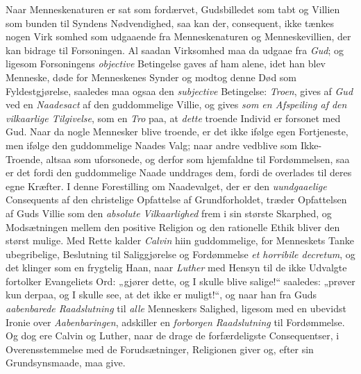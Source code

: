 Naar Menneskenaturen er sat som fordærvet, Gudsbilledet som tabt og Villien som
bunden til Syndens Nødvendighed, saa kan der, consequent, ikke tænkes nogen
Virk\-%
somhed som udgaaende fra Menneskenaturen og Menneskevillien, der kan bidrage til
Forsoningen. Al saadan Virksomhed maa da udgaae fra \emph{Gud}; og ligesom
Forsoningens \emph{objective} Betingelse gaves af ham alene, idet han blev
Menneske, døde for Menneskenes Synder og modtog denne Død som Fyldestgjørelse,
saaledes maa ogsaa den \emph{subjective} Betingelse: \emph{Troen}, gives af
\emph{Gud} ved en \emph{Naadesact} af den guddommelige Villie, og gives
\emph{som en Afspeiling af den vilkaarlige Tilgivelse}, som en \emph{Tro} paa,
at \emph{dette} troende Individ er forsonet med Gud. Naar da nogle Mennesker
blive troende, er det ikke ifølge egen Fortjeneste, men ifølge den guddommelige
Naades Valg; naar andre vedblive som Ikke-Troende, altsaa som uforsonede, og
derfor som hjemfaldne til Fordømmelsen, saa er det fordi den guddommelige Naade
unddrages dem, fordi de overlades til deres egne Kræfter. I denne Forestilling
om Naadevalget, der er den \emph{uundgaaelige} Consequents af den christelige
Opfattelse af Grundforholdet, træder Opfattelsen af Guds Villie som den
\emph{absolute Vilkaarlighed} frem i sin største Skarphed, og Modsætningen
mellem den positive Religion og den rationelle Ethik bliver den størst mulige.
Med Rette kalder \emph{Calvin} hiin guddommelige, for Menneskets Tanke
ubegribelige, Beslutning til Saliggjørelse og Fordømmelse
\emph{\textit{et horribile decretum}}, og det klinger som en frygtelig Haan,
naar \emph{Luther} med Hensyn til de ikke Udvalgte fortolker Evangeliets Ord:
„gjører dette, og I skulle blive salige!“ saaledes: „prøver kun derpaa, og I
skulle see, at det ikke er muligt!“, og naar han fra Guds \emph{aabenbarede
Raadslutning} til \emph{alle} Menneskers Salighed, ligesom med en ubevidst
Ironie over \emph{Aabenbaringen}, adskiller en \emph{forborgen Raadslutning} til
Fordømmelse. Og dog ere Calvin og Luther, naar de drage de forfærdeligste
Consequentser, i Overensstemmelse med de Forudsætninger, Religionen giver og,
efter sin Grundsynsmaade, maa give.

